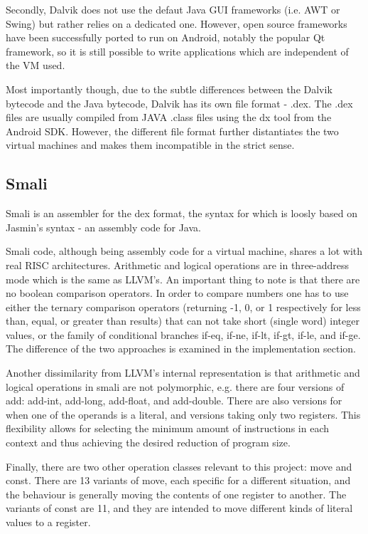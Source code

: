 \documentclass[parskip]{cs4rep}
\begin{document}
Secondly, Dalvik does not use the defaut Java GUI frameworks (i.e. AWT or Swing) but rather relies on a dedicated one. However, open source frameworks have been successfully ported to run on Android, notably the popular Qt framework, so it is still possible to write applications which are independent of the VM  used.

Most importantly though, due to the subtle differences between the Dalvik bytecode and the Java bytecode, Dalvik has its own file format - .dex. The .dex files are usually compiled from JAVA .class files using the dx tool from the Android SDK. However, the different file format further distantiates the two virtual machines and makes them incompatible in the strict sense.

\subsection{Smali}

Smali is an assembler for the dex format, the syntax for which is loosly based on Jasmin's syntax - an assembly code for Java\cite{GoogleProjectHosting2013}.

Smali code, although being assembly code for a virtual machine, shares a lot with real RISC architectures. Arithmetic and logical operations are in three-address mode\cite{TheAndroidOpenSourceProject2007} which is the same as LLVM's. An important thing to note is that there are no boolean comparison operators. In order to compare numbers one has to use either the ternary comparison operators (returning -1, 0, or 1 respectively for less than, equal, or greater than results) that can not take short (single word) integer values, or the family of conditional branches if-eq, if-ne, if-lt, if-gt, if-le, and if-ge. The difference of the two approaches is examined in the implementation section.

Another dissimilarity from LLVM's internal representation is that arithmetic and logical operations in smali are not polymorphic, e.g. there are four versions of add: add-int, add-long, add-float, and add-double. There are also versions for when one of the operands is a literal, and versions taking only two registers. This flexibility allows for selecting the minimum amount of instructions in each context and thus achieving the desired reduction of program size.

Finally, there are two other operation classes relevant to this project: move and const. There are 13 variants of move, each specific for a different situation, and the behaviour is generally moving the contents of one register to another. The variants of const are 11, and they are intended to move different kinds of literal values to a register.
\end{document}
